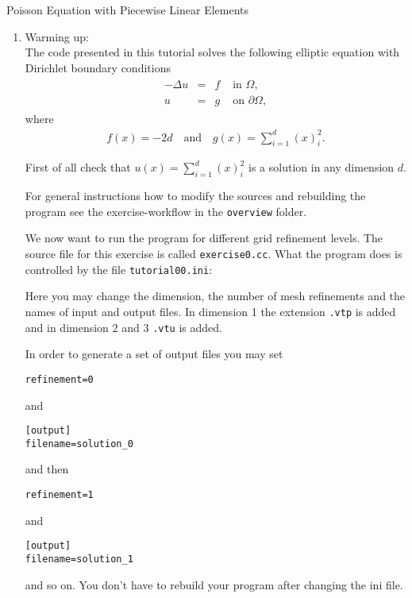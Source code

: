 \documentclass[12pt,a4paper]{article}
\newcommand{\Laplace}{\Delta}
\begin{document}
\begin{Exercise}{Poisson Equation with Piecewise Linear Elements}



\begin{enumerate}
\item {\sc Warming up}:\\
  The code presented in this tutorial solves the following elliptic
  equation with Dirichlet boundary conditions
  \begin{align*}
    \begin{array}{rcll}
      -\Laplace u  & = & f & \text{ in } \Omega, \\
      u & = & g & \text{ on } \partial\Omega,
    \end{array}
  \end{align*}
  where
  \begin{align*}
    f(x) = -2d \quad\text{and}\quad  g(x) = \sum_{i=1}^d (x)_i^2.
  \end{align*}

  First of all check that $u(x) = \sum_{i=1}^d (x)_i^2$ is a solution
  in any dimension $d$.

  For general instructions how to modify the sources and rebuilding
  the program see the exercise-workflow in the \lstinline{overview} folder.  
  
  
  We now want to run the program for different grid
  refinement levels.  The source file for this exercise is called
  \lstinline{exercise0.cc}.  What the program does is controlled by
  the file \lstinline{tutorial00.ini}:
  

  Here you may change the dimension, the number of mesh refinements
  and the names of input and output files. In dimension 1 the
  extension \lstinline{.vtp} is added and in dimension 2 and 3
  \lstinline{.vtu} is added.

  In order to generate a set of output files you may set
  \begin{lstlisting}
refinement=0
  \end{lstlisting}
  and
  \begin{lstlisting}
[output]
filename=solution_0
  \end{lstlisting}
  and then
  \begin{lstlisting}
refinement=1
  \end{lstlisting}
  and
  \begin{lstlisting}
[output]
filename=solution_1
  \end{lstlisting}
  and so on.  You don't have to rebuild your program after changing
  the ini file.


\end{enumerate}
\end{Exercise}
\end{document}
